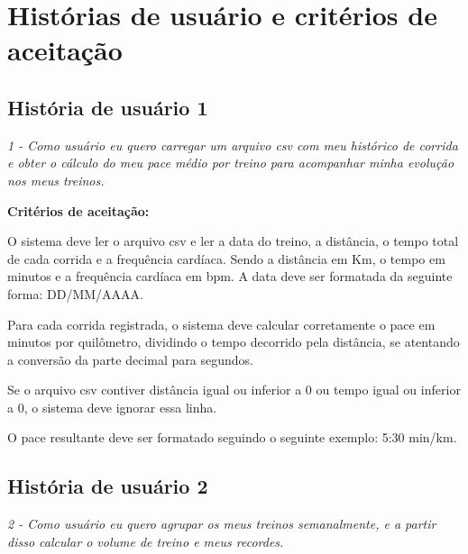 \documentclass[12pt,a4paper]{article}
\newcommand{\historia}[1]{%
  \par\noindent\colorbox{caixa}{%
    \parbox{\dimexpr\linewidth-2\fboxsep\relax}{\itshape #1}}\par\medskip}
\begin{document}
\section{Histórias de usuário e critérios de aceitação}

\subsection{História de usuário 1}

\historia{1 - Como usuário eu quero carregar um arquivo csv com meu histórico de
corrida e obter o cálculo do meu pace médio por treino para acompanhar minha
evolução nos meus treinos.}

\noindent\textbf{Critérios de aceitação:}
\begin{criterios}[label=\textbf{1.\arabic*:}]
  \item O sistema deve ler o arquivo csv e ler a data do treino, a distância, o tempo total de cada
        corrida e a frequência cardíaca. Sendo a distância em Km, o tempo em minutos e a frequência cardíaca em bpm.
        A data deve ser formatada da seguinte forma: DD/MM/AAAA.
  \item Para cada corrida registrada, o sistema deve calcular corretamente o pace em
        minutos por quilômetro, dividindo o tempo decorrido pela distância, se
        atentando a conversão da parte decimal para segundos.
  \item Se o arquivo csv contiver distância igual ou inferior a 0 ou tempo igual ou
        inferior a 0, o sistema deve ignorar essa linha.
  \item O pace resultante deve ser formatado seguindo o seguinte exemplo: 5:30 min/km.
\end{criterios}

\subsection{História de usuário 2}

\historia{2 - Como usuário eu quero agrupar os meus treinos semanalmente, e a partir
disso calcular o volume de treino e meus recordes.}
\end{document}
